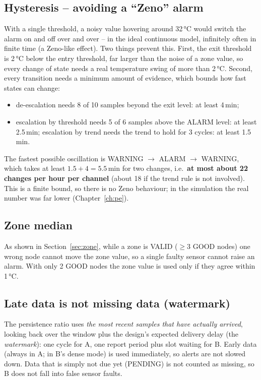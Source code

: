 \documentclass[11pt,a4paper]{report}
\begin{document}
\subsection{Hysteresis -- avoiding a ``Zeno'' alarm}
With a single threshold, a noisy value hovering around 32\,°C would switch the alarm on and off over and over -- in the ideal continuous model, infinitely often in finite time (a Zeno-like effect). Two things prevent this. First, the exit threshold is 2\,°C below the entry threshold, far larger than the noise of a zone value, so every change of state needs a real temperature swing of more than 2\,°C. Second, every transition needs a minimum amount of evidence, which bounds how fast states can change:
\begin{itemize}[noitemsep]
  \item de-escalation needs 8 of 10 samples beyond the exit level: at least 4\,min;
  \item escalation by threshold needs 5 of 6 samples above the ALARM level: at least 2.5\,min; escalation by trend needs the trend to hold for 3 cycles: at least 1.5\,min.
\end{itemize}
The fastest possible oscillation is WARNING $\to$ ALARM $\to$ WARNING, which takes at least $1.5 + 4 = 5.5$\,min for two changes, i.e.\ \textbf{at most about 22 changes per hour per channel} (about 18 if the trend rule is not involved). This is a finite bound, so there is no Zeno behaviour; in the simulation the real number was far lower (Chapter~\ref{ch:pe}).

\subsection{Zone median}
As shown in Section~\ref{sec:zone}, while a zone is VALID ($\geq 3$ GOOD nodes) one wrong node cannot move the zone value, so a single faulty sensor cannot raise an alarm. With only 2 GOOD nodes the zone value is used only if they agree within 1\,°C.

\subsection{Late data is not missing data (watermark)}
The persistence ratio uses \emph{the most recent samples that have actually arrived}, looking back over the window plus the design's expected delivery delay (the \emph{watermark}): one cycle for A, one report period plus slot waiting for B. Early data (always in A; in B's dense mode) is used immediately, so alerts are not slowed down. Data that is simply not due yet (PENDING) is not counted as missing, so B does not fall into false sensor faults.
\end{document}
